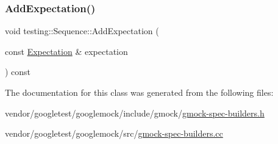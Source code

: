 \subsubsection{\texorpdfstring{Add\+Expectation()}{AddExpectation()}}
{\footnotesize\ttfamily void testing\+::\+Sequence\+::\+Add\+Expectation (\begin{DoxyParamCaption}\item[{const \hyperlink{classtesting_1_1_expectation}{Expectation} \&}]{expectation }\end{DoxyParamCaption}) const}



The documentation for this class was generated from the following files\+:\begin{DoxyCompactItemize}
\item 
vendor/googletest/googlemock/include/gmock/\hyperlink{gmock-spec-builders_8h}{gmock-\/spec-\/builders.\+h}\item 
vendor/googletest/googlemock/src/\hyperlink{gmock-spec-builders_8cc}{gmock-\/spec-\/builders.\+cc}\end{DoxyCompactItemize}
